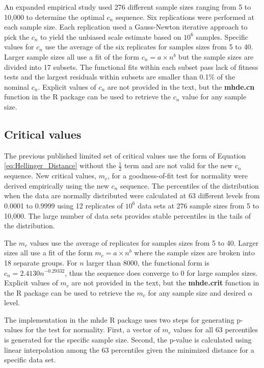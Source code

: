 \documentclass{article}
\begin{document}
An expanded empirical study used 276 different sample sizes ranging from 5 to 10,000 to determine the optimal $c_n$ sequence.  Six replications were performed at each sample size.  Each replication used a Gauss-Newton iterative approach to pick the $c_n$ to yield the unbiased scale estimate based on $10^6$ samples.  Specific values for $c_n$ use the average of the six replicates for samples sizes from 5 to 40.  Larger sample sizes all use a fit of the form $c_n=a\times n^b$ but the sample sizes are divided into 17 subsets.  The functional fits within each subset pass lack of fitness tests and the largest residuals within subsets are smaller than 0.1\% of the nominal $c_n$.  Explicit values of $c_n$ are not provided in the text, but the \textbf{mhde.cn} function in the R package can be used to retrieve the $c_n$ value for any sample size.

\subsection{Critical values}

The previous published limited set of critical values \parencite{eslinger1991} use the form of Equation \ref{eq:Hellinger_Distance} without the $\frac{1}{2}$ term and are not valid for the new $c_n$ sequence.  New critical values, $m_c$, for a goodness-of-fit test for normality were derived empirically using the new $c_n$ sequence.  The percentiles of the distribution when the data are normally distributed were calculated at 63 different levels from 0.0001 to 0.9999 using 12 replicates of $10^6$ data sets at 276 sample sizes from 5 to 10,000.  The large number of data sets provides stable percentiles in the tails of the distribution.

The $m_c$ values use the average of replicates for samples sizes from 5 to 40.  Larger sizes all use a fit of the form $m_c=a\times n^b$ where the sample sizes are broken into 18 separate groups. For $n$ larger than 8000, the functional form is $c_n=2.4130 n^{-0.29332}$, thus the sequence does converge to $0$ for large samples sizes.  Explicit values of $m_c$ are not provided in the text, but the \textbf{mhde.crit} function in the R package can be used to retrieve the $m_c$ for any sample size and desired $\alpha$ level.

The implementation in the mhde R package uses two steps for generating p-values for the test for normality.  First, a vector of $m_c$ values for all 63 percentiles is generated for the specific sample size.  Second, the p-value is calculated using linear interpolation among the 63 percentiles given the minimized distance for a specific data set.
\end{document}
